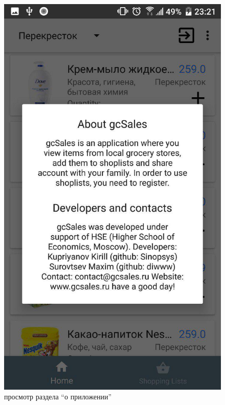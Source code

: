 \begin{figure}[h!]
    \centering
    \includegraphics[height=0.38\textheight]{./screenshots/3/about.jpg}
    \caption{\small{просмотр раздела ``о приложении''}}
    \endminipage\hfill

\end{figure}
